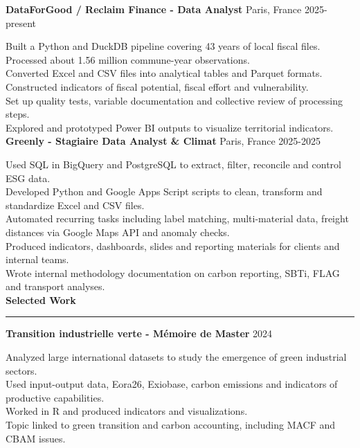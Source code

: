 \documentclass[11pt,a4paper]{article}
\newcommand{\sectiontitle}[1]{\vspace{0.26cm}\textbf{\large #1}\vspace{0.10cm}\hrule\vspace{0.13cm}}
\begin{document}
\textbf{DataForGood / Reclaim Finance - Data Analyst} \hfill Paris, France \hfill 2025-present

Built a Python and DuckDB pipeline covering 43 years of local fiscal files.\\
Processed about 1.56 million commune-year observations.\\
Converted Excel and CSV files into analytical tables and Parquet formats.\\
Constructed indicators of fiscal potential, fiscal effort and vulnerability.\\
Set up quality tests, variable documentation and collective review of processing steps.\\
Explored and prototyped Power BI outputs to visualize territorial indicators.\\

\vspace{0.25cm}
\textbf{Greenly - Stagiaire Data Analyst \& Climat} \hfill Paris, France \hfill 2025-2025

Used SQL in BigQuery and PostgreSQL to extract, filter, reconcile and control ESG data.\\
Developed Python and Google Apps Script scripts to clean, transform and standardize Excel and CSV files.\\
Automated recurring tasks including label matching, multi-material data, freight distances via Google Maps API and anomaly checks.\\
Produced indicators, dashboards, slides and reporting materials for clients and internal teams.\\
Wrote internal methodology documentation on carbon reporting, SBTi, FLAG and transport analyses.\\


\sectiontitle{Selected Work}

\textbf{Transition industrielle verte - Mémoire de Master} \hfill 2024

Analyzed large international datasets to study the emergence of green industrial sectors.\\
Used input-output data, Eora26, Exiobase, carbon emissions and indicators of productive capabilities.\\
Worked in R and produced indicators and visualizations.\\
Topic linked to green transition and carbon accounting, including MACF and CBAM issues.\\
\end{document}

